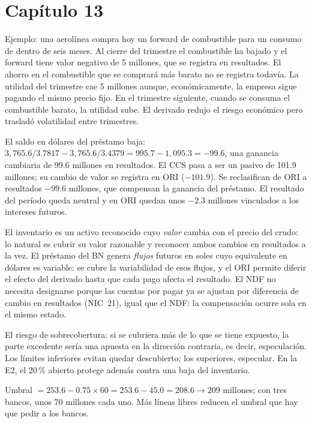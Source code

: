 \section*{Capítulo 13}

 Ejemplo: una aerolínea compra hoy un forward de combustible para un consumo de dentro de seis meses. Al cierre del trimestre el combustible ha bajado y el forward tiene valor negativo de 5 millones, que se registra en resultados. El ahorro en el combustible que se comprará más barato no se registra todavía. La utilidad del trimestre cae 5 millones aunque, económicamente, la empresa sigue pagando el mismo precio fijo. En el trimestre siguiente, cuando se consuma el combustible barato, la utilidad sube. El derivado redujo el riesgo económico pero trasladó volatilidad entre trimestres.

 El saldo en dólares del préstamo baja: $3{,}765.6/3.7817-3{,}765.6/3.4379=995.7-1{,}095.3=-99.6$, una ganancia cambiaria de 99.6 millones en resultados. El CCS pasa a ser un pasivo de 101.9 millones; su cambio de valor se registra en ORI ($-101.9$). Se reclasifican de ORI a resultados $-99.6$ millones, que compensan la ganancia del préstamo. El resultado del período queda neutral y en ORI quedan unos $-2.3$ millones vinculados a los intereses futuros.

 El inventario es un activo reconocido cuyo \emph{valor} cambia con el precio del crudo: lo natural es cubrir su valor razonable y reconocer ambos cambios en resultados a la vez. El préstamo del BN genera \emph{flujos} futuros en soles cuyo equivalente en dólares es variable: se cubre la variabilidad de esos flujos, y el ORI permite diferir el efecto del derivado hasta que cada pago afecta el resultado. El NDF no necesita designarse porque las cuentas por pagar ya se ajustan por diferencia de cambio en resultados (NIC~21), igual que el NDF: la compensación ocurre sola en el mismo estado.

 El riesgo de sobrecobertura: si se cubriera más de lo que se tiene expuesto, la parte excedente sería una apuesta en la dirección contraria, es decir, especulación. Los límites inferiores evitan quedar descubierto; los superiores, especular. En la E2, el 20\,\% abierto protege además contra una baja del inventario.

 Umbral $=253.6-0.75\times60=253.6-45.0=208.6\to209$ millones; con tres bancos, unos 70 millones cada uno. Más líneas libres reducen el umbral que hay que pedir a los bancos.

